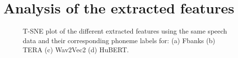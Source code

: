 \section{Analysis of the extracted features}
\begin{figure}
  \begin{center}
  \centering
  \caption{T-SNE plot of the different extracted features using the same speech data and their corresponding phoneme labels for: (a) Fbanks (b) TERA (c) Wav2Vec2 (d) HuBERT.}
  \label{fig:tsne_SSL}  
\end{center}
\end{figure}
